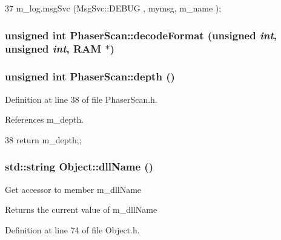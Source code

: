 \begin{DoxyCode}
37 { m_log.msgSvc (MsgSvc::DEBUG   , mymsg, m_name ); }
\end{DoxyCode}
\hypertarget{classPhaserScan_ad01a0ce0223859a138e3a78023a924bb}{
\subsubsection[{decodeFormat}]{\setlength{\rightskip}{0pt plus 5cm}unsigned int PhaserScan::decodeFormat (unsigned {\em int}, \/  unsigned {\em int}, \/  {\bf RAM} $\ast$)}}
\label{classPhaserScan_ad01a0ce0223859a138e3a78023a924bb}
\hypertarget{classPhaserScan_ad2d47975431e765c906ba51eeeb4365d}{
\subsubsection[{depth}]{\setlength{\rightskip}{0pt plus 5cm}unsigned int PhaserScan::depth ()}}
\label{classPhaserScan_ad2d47975431e765c906ba51eeeb4365d}


Definition at line 38 of file PhaserScan.h.

References m\_\-depth.


\begin{DoxyCode}
38 {return m_depth;};
\end{DoxyCode}
\hypertarget{classObject_a2e3947f2870094c332d7454117f3ec63}{
\subsubsection[{dllName}]{\setlength{\rightskip}{0pt plus 5cm}std::string Object::dllName ()}}
\label{classObject_a2e3947f2870094c332d7454117f3ec63}
Get accessor to member m\_\-dllName \begin{DoxyReturn}{Returns}
the current value of m\_\-dllName 
\end{DoxyReturn}


Definition at line 74 of file Object.h.

